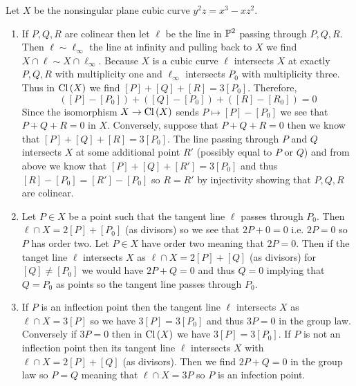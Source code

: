 \documentclass[12pt]{article}
\begin{document}
Let $X$ be the nonsingular plane cubic curve $y^2 z = x^3 - x z^2$. 
\begin{enumerate}
\item 
If $P, Q, R$ are colinear then let $\ell$ be the line in $\P^2$ passing through $P,Q,R$. Then $\ell \sim \ell_\infty$ the line at infinity and pulling back to $X$ we find $X \cap \ell \sim X \cap \ell_{\infty}$. Because $X$ is a cubic curve $\ell$ intersects $X$ at exactly $P,Q,R$ with multiplicity one and $\ell_{\infty}$ intersects $P_0$ with multiplicity three. Thus in $\Cl{X}$ we find $[P] + [Q] + [R] = 3 [P_0]$. Therefore,
\[ ([P] - [P_0]) + ([Q] - [P_0]) + ([R] - [R_0])  = 0 \]
Since the isomorphism $X \to \Cl{X}$ sends $P \mapsto [P] - [P_0]$ we see that $P + Q + R = 0$ in $X$. Conversely, suppose that $P + Q + R = 0$ then we know that $[P] + [Q] + [R] = 3 [P_0]$. The line passing through $P$ and $Q$ intersects $X$ at some additional point $R'$ (possibly equal to $P$ or $Q$) and from above we know that $[P] + [Q] + [R'] = 3 [P_0]$ and thus $[R] - [P_0] = [R'] - [P_0]$ so $R = R'$ by injectivity showing that $P,Q,R$ are colinear.

\item Let $P \in X$ be a point such that the tangent line $\ell$ passes through $P_0$. Then $\ell \cap X = 2 [P] + [P_0]$ (as divisors) so we see that $2 P + 0 = 0$ i.e. $2 P = 0$ so $P$ has order two. Let $P \in X$ have order two meaning that $2 P = 0$. Then if the tanget line $\ell$ intersects $X$ as $\ell \cap X = 2 [P] + [Q]$ (as divisors) for $[Q] \neq [P_0]$ we would have $2 P + Q = 0$ and thus $Q = 0$ implying that $Q = P_0$ as points so the tangent line passes through $P_0$. 

\item If $P$ is an inflection point then the tangent line $\ell$ intersects $X$ as $\ell \cap X = 3 [P]$ so we have $3 [P] = 3 [P_0]$ and thus $3 P = 0$ in the group law. Conversely if $3 P = 0$ then in $\Cl{X}$ we have $3 [P] = 3 [P_0]$. If $P$ is not an inflection point then its tangent line $\ell$ intersects $X$ with $\ell \cap X = 2 [P] + [Q]$ (as divisors). Then we find $2 P + Q = 0$ in the group law so $P = Q$ meaning that $\ell \cap X = 3 P$ so $P$ is an infection point.


\end{enumerate}
\end{document}

